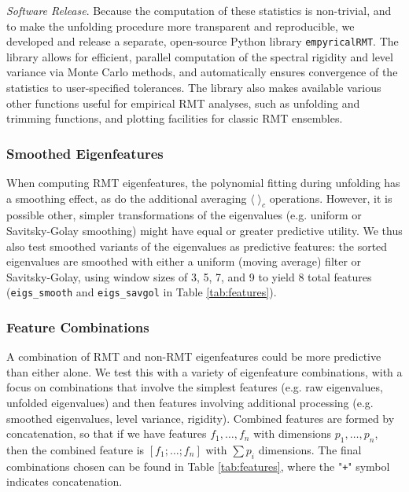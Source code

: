 \documentclass[12pt]{spieman}  %
\newcommand{\code}[1]{\small\texttt{#1}\normalsize}
\begin{document}
\begin{spacing}{2}
\textit{Software Release}. Because the computation of these statistics is
non-trivial, and to make the unfolding procedure more transparent and
reproducible, we developed and release a separate, open-source Python library
\code{empyricalRMT}\cite{dm-bergerStfxecutablesEmpyricalRMTV12022}. The library
allows for efficient, parallel computation of the spectral rigidity and level
variance via Monte Carlo methods, and automatically ensures convergence of the
statistics to user-specified tolerances. The library also makes available
various other functions useful for empirical RMT analyses, such as unfolding
and trimming functions, and plotting facilities for classic RMT ensembles.


\subsubsection{Smoothed Eigenfeatures}
\label{sec:eigs-only}

When computing RMT eigenfeatures, the polynomial fitting during unfolding has a
smoothing effect, as do the additional averaging \(\langle\;\rangle_c\)
operations. However, it is possible other, simpler transformations of the
eigenvalues (e.g. uniform or Savitsky-Golay smoothing) might have equal or
greater predictive utility. We thus also test smoothed variants of the
eigenvalues as predictive features: the sorted eigenvalues are smoothed with
either a uniform (moving average) filter or Savitsky-Golay, using window sizes
of 3, 5, 7, and 9 to yield 8 total features (\code{eigs\_smooth} and
\code{eigs\_savgol} in Table \ref{tab:features}).


\subsubsection{Feature Combinations}

A combination of RMT and non-RMT eigenfeatures could be more predictive than
either alone. We test this with a variety of eigenfeature combinations, with a
focus on combinations that involve the simplest features (e.g. raw eigenvalues,
unfolded eigenvalues) and then features involving additional processing (e.g.
smoothed eigenvalues, level variance, rigidity). Combined features are formed
by concatenation, so that if we have features \(f_1, \dots,  f_n\) with
dimensions \(p_1, \dots, p_n\), then the combined feature is \([f_1; \dots;
f_n]\) with \(\sum p_i\) dimensions.  The final combinations chosen can be
found in Table \ref{tab:features}, where the "\code{+}" symbol indicates concatenation.



\end{spacing}
\end{document}
